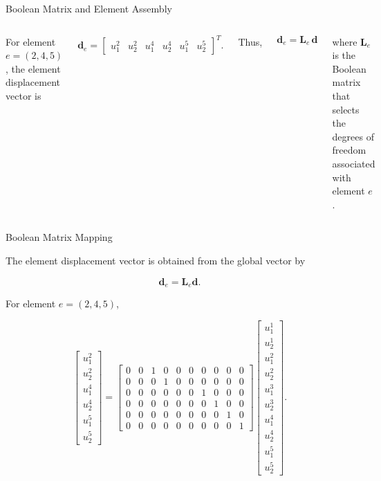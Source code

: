 \documentclass[aspectratio=169]{beamer}
\begin{document}
\begin{frame}{Boolean Matrix and Element Assembly}
\begin{columns}[T,onlytextwidth]
For element \(e=(2,4,5)\), the element displacement vector is

\[
\mathbf{d}_e
=
\begin{bmatrix}
u_1^2 & u_2^2 & u_1^4 & u_2^4 & u_1^5 & u_2^5
\end{bmatrix}^{T}.
\]

Thus,

\[
\boxed{
\mathbf{d}_e=\mathbf{L}_e\,\mathbf{d}
}
\]

where \(\mathbf{L}_e\) is the Boolean matrix that selects the
degrees of freedom associated with element \(e\).

\end{columns}

\end{frame}

\begin{frame}{Boolean Matrix Mapping}

The element displacement vector is obtained from the global vector by

\[
\mathbf{d}_e = \mathbf{L}_e \mathbf{d}.
\]

For element \(e=(2,4,5)\),

\[
\begin{bmatrix}
u_1^2 \\
u_2^2 \\
u_1^4 \\
u_2^4 \\
u_1^5 \\
u_2^5
\end{bmatrix}
=
\begin{bmatrix}
0&0&1&0&0&0&0&0&0&0\\
0&0&0&1&0&0&0&0&0&0\\
0&0&0&0&0&0&1&0&0&0\\
0&0&0&0&0&0&0&1&0&0\\
0&0&0&0&0&0&0&0&1&0\\
0&0&0&0&0&0&0&0&0&1
\end{bmatrix}
\begin{bmatrix}
u_1^1\\
u_2^1\\
u_1^2\\
u_2^2\\
u_1^3\\
u_2^3\\
u_1^4\\
u_2^4\\
u_1^5\\
u_2^5
\end{bmatrix}.
\]

\end{frame}
\end{document}
